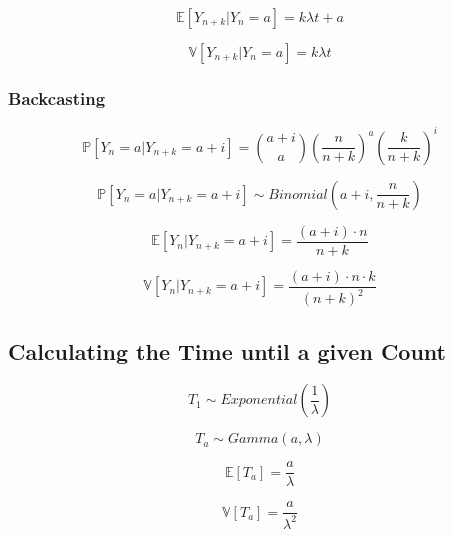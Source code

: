 \documentclass[12pt]{article}
\begin{document}
    \begin{equation}
        \mathbb{E}[Y_{n + k} | Y_n = a] = k \lambda t + a
    \end{equation}

    \begin{equation}
        \mathbb{V}[Y_{n + k} | Y_n = a] = k \lambda t
    \end{equation}

    \subsubsection{Backcasting}
    \begin{equation}
        \mathbb{P}[Y_n = a | Y_{n + k} = a + i ] =
        \binom{a + i}{a} 
        \left(\frac{n}{n + k}\right)^a 
        \left(\frac{k}{n + k}\right)^i
    \end{equation}

    \begin{equation}
        \mathbb{P}[Y_n = a | Y_{n + k} = a + i ] 
        \sim Binomial\left(a + i, \frac{n}{n+k}\right)
    \end{equation}

    \begin{equation}
        \mathbb{E}[Y_n | Y_{n + k} = a + i ] =
        \frac{(a + i) \cdot n}{n+k}
    \end{equation}

    \begin{equation}
        \mathbb{V}[Y_n | Y_{n + k} = a + i ] = 
        \frac{(a + i) \cdot n \cdot k}{(n + k)^2}
    \end{equation}

    \subsection{Calculating the Time until a given Count}

    \begin{equation}
        T_1 \sim Exponential\left(\frac{1}{\lambda}\right)
    \end{equation}

    \begin{equation}
        T_a \sim Gamma(a, \lambda)
    \end{equation}

    \begin{equation}
        \mathbb{E}[T_a] = \frac{a}{\lambda}
    \end{equation}

    \begin{equation}
        \mathbb{V}[T_a] = \frac{a}{\lambda^2}
    \end{equation}
\end{document}
